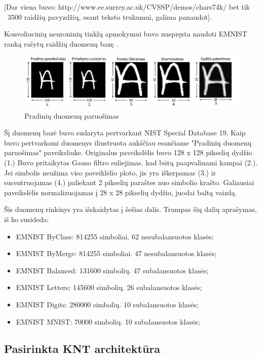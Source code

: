 \documentclass{VUMIFInfBakalaurinis}
\begin{document}
[Dar viena buvo: http://www.ee.surrey.ac.uk/CVSSP/demos/chars74k/ bet tik ~3500 raidžių pavyzdžių, esant teksto trukumui, galima panaudot].

Konvoliucinių neuroninių tinklų apmokymui buvo nuspręsta naudoti EMNIST ranką rašytų raidžių duomenų bazę \cite{Emnist}. 

\begin{figure}[H]
    \centering
    \includegraphics[scale=1.5]{img/emnist_sudarymas.png}
    \caption{Pradinių duomenų paruošimas}
    \label{img:emnist_sudarymas}
\end{figure}

Šį duomenų bazė buvo sudaryta pertvarkant NIST Special Database 19. Kaip buvo pertvarkomi duomenys iliustruota aukščiau esančiame "Pradinių duomenų paruošimas" paveiksliuke. Originalus paveikslėlis buvo 128 x 128 pikselių dydžio (1.) Buvo pritaikytas Gauso filtro suliejimas, kad būtų paapvalinami kampai (2.). Jei simbolis neužima viso paveiklėlio ploto, jis yra iškerpamas (3.) ir sucentruojamas (4.) paliekant 2 pikselių paraštes nuo simbolio krašto. Galiausiai paveikslėlis normalizuojamas į 28 x 28 pikselių dydžio, juodai baltą vaizdą.

Šis duomenų rinkinys yra išskaidytas į šešias dalis. Trumpas šių dalių aprašymas, iš ko susideda:
\begin{itemize}
    \item EMNIST ByClass: 814255 simboliai. 62 nesubalansuotos klasės;
    \item EMNIST ByMerge: 814255 simboliai. 47 nesubalansuotos klasės;
    \item EMNIST Balanced:  131600 simbolių. 47 subalansuotos klasės;
    \item EMNIST Letters: 145600 simbolių. 26 subalansuotos klasės;
    \item EMNIST Digits: 280000 simbolių. 10 subalansuotos klasės;
    \item EMNIST MNIST: 70000 simbolių. 10 subalansuotos klasės;
\end{itemize}
    


\subsection{Pasirinkta KNT architektūra}
\end{document}
